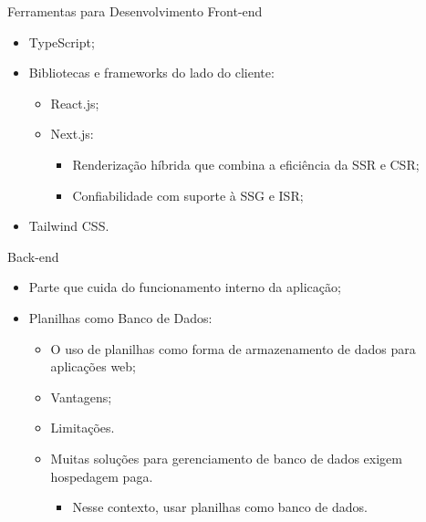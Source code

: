 \begin{frame}{Ferramentas para Desenvolvimento Front-end}
    \begin{itemize}
        \item TypeScript; \vspace{0.5cm}
        \item Bibliotecas e frameworks do lado do cliente: \vspace{0.25cm}
        \begin{itemize}
            \item React.js; \vspace{0.25cm}
            \item Next.js: \vspace{0.25cm}
                \begin{itemize}
                    \item Renderização híbrida que combina a eficiência da SSR e CSR; \vspace{0.25cm}
                    \item Confiabilidade com suporte à SSG e ISR; \vspace{0.25cm}
                \end{itemize}
        \end{itemize}
        \item Tailwind CSS. \vspace{0.5cm}
    \end{itemize}
\end{frame}

\begin{frame}{Back-end}
    \begin{itemize}
        \item Parte que cuida do funcionamento interno da aplicação; \vspace{0.25cm}
        \item Planilhas como Banco de Dados: \vspace{0.25cm}
              \begin{itemize}
                  \item O uso de planilhas como forma de armazenamento de dados para aplicações web; \vspace{0.25cm}
                  \item Vantagens; \vspace{0.25cm}
                  \item Limitações. \vspace{0.25cm}
                  \item Muitas soluções para gerenciamento de banco de dados exigem hospedagem paga. \vspace{0.25cm}
                  \begin{itemize}
                    \item Nesse contexto, usar planilhas como banco de dados.
                  \end{itemize}
              \end{itemize}
    \end{itemize}
\end{frame}

